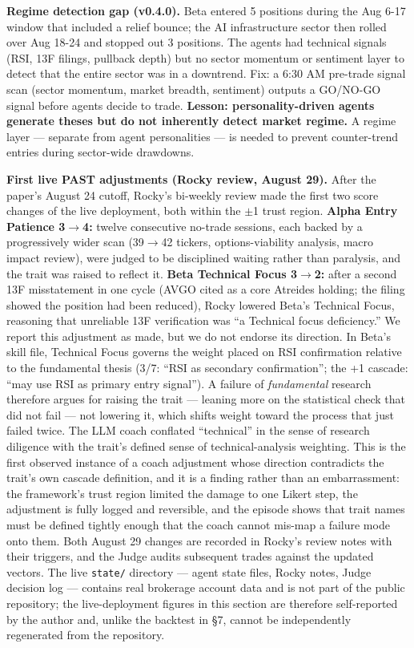 \documentclass[11pt]{article}
\begin{document}
\textbf{Regime detection gap (v0.4.0).} Beta entered 5 positions during the Aug 6-17 window that included a relief bounce; the AI infrastructure sector then rolled over Aug 18-24 and stopped out 3 positions. The agents had technical signals (RSI, 13F filings, pullback depth) but no sector momentum or sentiment layer to detect that the entire sector was in a downtrend. Fix: a 6:30 AM pre-trade signal scan (sector momentum, market breadth, sentiment) outputs a GO/NO-GO signal before agents decide to trade. \textbf{Lesson: personality-driven agents generate theses but do not inherently detect market regime.} A regime layer --- separate from agent personalities --- is needed to prevent counter-trend entries during sector-wide drawdowns.

\textbf{First live PAST adjustments (Rocky review, August 29).} After the paper's August 24 cutoff, Rocky's bi-weekly review made the first two score changes of the live deployment, both within the $\pm$1 trust region. \textbf{Alpha Entry Patience 3$\rightarrow$4:} twelve consecutive no-trade sessions, each backed by a progressively wider scan (39$\rightarrow$42 tickers, options-viability analysis, macro impact review), were judged to be disciplined waiting rather than paralysis, and the trait was raised to reflect it. \textbf{Beta Technical Focus 3$\rightarrow$2:} after a second 13F misstatement in one cycle (AVGO cited as a core Atreides holding; the filing showed the position had been reduced), Rocky lowered Beta's Technical Focus, reasoning that unreliable 13F verification was ``a Technical focus deficiency.'' We report this adjustment as made, but we do not endorse its direction. In Beta's skill file, Technical Focus governs the weight placed on RSI confirmation relative to the fundamental thesis (3/7: ``RSI as secondary confirmation''; the +1 cascade: ``may use RSI as primary entry signal''). A failure of \emph{fundamental} research therefore argues for raising the trait --- leaning more on the statistical check that did not fail --- not lowering it, which shifts weight toward the process that just failed twice. The LLM coach conflated ``technical'' in the sense of research diligence with the trait's defined sense of technical-analysis weighting. This is the first observed instance of a coach adjustment whose direction contradicts the trait's own cascade definition, and it is a finding rather than an embarrassment: the framework's trust region limited the damage to one Likert step, the adjustment is fully logged and reversible, and the episode shows that trait names must be defined tightly enough that the coach cannot mis-map a failure mode onto them. Both August 29 changes are recorded in Rocky's review notes with their triggers, and the Judge audits subsequent trades against the updated vectors. The live \texttt{state/} directory --- agent state files, Rocky notes, Judge decision log --- contains real brokerage account data and is not part of the public repository; the live-deployment figures in this section are therefore self-reported by the author and, unlike the backtest in §7, cannot be independently regenerated from the repository.
\end{document}
